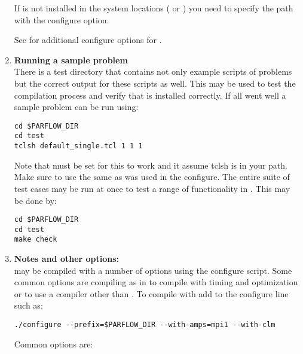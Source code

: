 \begin{enumerate}
If  is not installed in the system locations ( or
) you need to specify the path with the
 configure option.

See  for additional configure options for .

\item {\bf Running a sample problem}\\ There is a test directory that
  contains not only example scripts of \parflow{} problems but the
  correct output for these scripts as well.  This may be used to test
  the compilation process and verify that \parflow{} is installed
  correctly.  If all went well a sample \parflow{} problem can be run
  using:

\begin{display}\begin{verbatim}
cd $PARFLOW_DIR
cd test
tclsh default_single.tcl 1 1 1
\end{verbatim}\end{display}

Note that  must be set for this to work and it assume tclsh
is in your path.  Make sure to use the same  as was used in the
 configure. The entire suite of test cases may be run at once to test a range of functionality in \parflow{}.  This may be done by:
\begin{display}\begin{verbatim}
cd $PARFLOW_DIR
cd test
make check
\end{verbatim}\end{display}

\item {\bf Notes and other options:}\\ \parflow{} may be compiled with
 a number of options using the configure script.  Some common options
 are compiling  as in \cite{MM05,KM08a} to compile with
 timing and optimization or to use a compiler other than .
  To compile with  add  to the configure
 line such as:
\begin{display}\begin{verbatim}
./configure --prefix=$PARFLOW_DIR --with-amps=mpi1 --with-clm
\end{verbatim}\end{display}

Common options are:


\end{enumerate}
